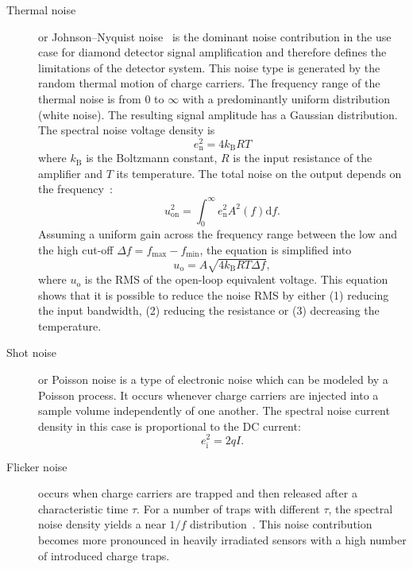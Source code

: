 \begin{description}
\item[Thermal noise]
or Johnson--Nyquist noise~\cite{PhysRev.32.97,PhysRev.32.110} is the dominant noise contribution in the use case for diamond detector signal amplification and therefore defines the limitations of the detector system. This noise type is generated by the random thermal motion of charge carriers. The frequency range of the thermal noise is from 0 to $\infty$ with a predominantly uniform distribution (white noise). The resulting signal amplitude has a Gaussian distribution. The spectral noise voltage density is
\begin{equation}
e^2_\mathrm{n} = 4 k_\mathrm{B}RT
\end{equation}
where $k_\mathrm{B}$ is the Boltzmann constant, $R$ is the input resistance of the amplifier and $T$ its temperature. The total noise on the output depends on the frequency~\cite{Spieler:1010490}:
\begin{equation}
u^2_\mathrm{on}=\int^\infty_0 e^2_\mathrm{n}A^2(f) \mathrm{d}f.
\end{equation}
Assuming a uniform gain across the frequency range between the low and the high cut-off $\Delta f = f_\mathrm{max}-f_\mathrm{min}$, the equation is simplified into
\begin{equation}
u_\mathrm{o}=A\sqrt{4k_\mathrm{B}RT\Delta f},
\end{equation}
where $u_\mathrm{o}$ is the RMS of the open-loop equivalent voltage. This equation shows that it is possible to reduce the noise RMS by either (1) reducing the input bandwidth, (2) reducing the resistance or (3) decreasing the temperature. 

\item[Shot noise] or Poisson noise is a type of electronic noise which can be modeled by a Poisson process. It occurs whenever charge carriers are injected into a sample volume independently of one another. The spectral noise current density in this case is proportional to the DC current:
\begin{equation}
e^2_\mathrm{i} = 2 q I.
\end{equation}

\item[Flicker noise]
occurs when charge carriers are trapped and then released after a characteristic time $\tau$. For a number of traps with different $\tau$, the spectral noise density yields a near $1/f$ distribution~\cite{Spieler:1010490}. This noise contribution becomes more pronounced in heavily irradiated sensors with a high number of introduced charge traps.
\end{description}











